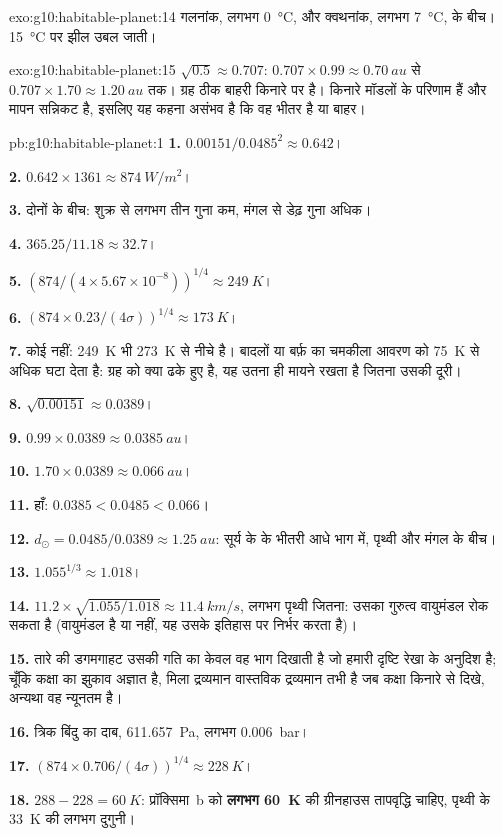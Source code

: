 \begin{solution}{exo:g10:habitable-planet:14}
गलनांक, लगभग \qty{0}{\degreeCelsius}, और क्वथनांक,
लगभग \qty{7}{\degreeCelsius}, के बीच। \qty{15}{\degreeCelsius} पर झील
उबल जाती।
\end{solution}

\begin{solution}{exo:g10:habitable-planet:15}
$\sqrt{0.5} \approx 0.707$: $0.707 \times 0.99 \approx \qty{0.70}{au}$
से $0.707 \times 1.70 \approx \qty{1.20}{au}$ तक। ग्रह ठीक बाहरी किनारे पर है।
किनारे मॉडलों के परिणाम हैं और मापन सन्निकट है, इसलिए
यह कहना असंभव है कि वह भीतर है या बाहर।
\end{solution}

\begin{solution}{pb:g10:habitable-planet:1}
\textbf{1.} $0.00151/0.0485^2 \approx 0.642$।

\textbf{2.} $0.642 \times 1361 \approx \qty{874}{W/m^2}$।

\textbf{3.} दोनों के बीच: शुक्र से लगभग तीन गुना कम, मंगल से डेढ़ गुना
अधिक।

\textbf{4.} $365.25/11.18 \approx 32.7$।

\textbf{5.} $(874/(4 \times 5.67\times10^{-8}))^{1/4} \approx \qty{249}{K}$।

\textbf{6.} $(874 \times 0.23/(4\sigma))^{1/4} \approx \qty{173}{K}$।

\textbf{7.} कोई नहीं: \qty{249}{K} भी \qty{273}{K} से नीचे है। बादलों या बर्फ़ का चमकीला
आवरण  को
\qty{75}{K} से अधिक घटा देता है: ग्रह को क्या ढके हुए है, यह उतना ही मायने रखता है जितना उसकी दूरी।

\textbf{8.} $\sqrt{0.00151} \approx 0.0389$।

\textbf{9.} $0.99 \times 0.0389 \approx \qty{0.0385}{au}$।

\textbf{10.} $1.70 \times 0.0389 \approx \qty{0.066}{au}$।

\textbf{11.} हाँ: $0.0385 < 0.0485 < 0.066$।

\textbf{12.} $d_\odot = 0.0485/0.0389 \approx \qty{1.25}{au}$: सूर्य के 
के भीतरी आधे भाग में, पृथ्वी और मंगल के बीच।

\textbf{13.} $1.055^{1/3} \approx 1.018$।

\textbf{14.} $11.2 \times \sqrt{1.055/1.018} \approx \qty{11.4}{km/s}$, लगभग
पृथ्वी जितना: उसका गुरुत्व वायुमंडल रोक सकता है (वायुमंडल है या नहीं, यह उसके इतिहास पर
निर्भर करता है)।

\textbf{15.} तारे की डगमगाहट उसकी गति का केवल वह भाग दिखाती है जो हमारी दृष्टि रेखा के
अनुदिश है; चूँकि कक्षा का झुकाव अज्ञात है, मिला द्रव्यमान वास्तविक द्रव्यमान तभी है जब कक्षा
किनारे से दिखे, अन्यथा वह न्यूनतम है।

\textbf{16.} त्रिक बिंदु का दाब, \qty{611.657}{Pa}, लगभग
\qty{0.006}{bar}।

\textbf{17.} $(874 \times 0.706/(4\sigma))^{1/4} \approx \qty{228}{K}$।

\textbf{18.} $288 - 228 = \qty{60}{K}$: प्रॉक्सिमा~b को \textbf{लगभग \qty{60}{K}} की
ग्रीनहाउस तापवृद्धि चाहिए, पृथ्वी के \qty{33}{K} की लगभग दुगुनी।
\end{solution}
